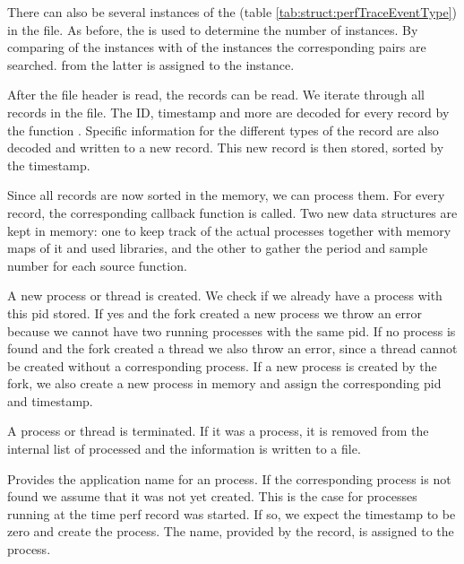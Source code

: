 There can also be several instances of the  (table \ref{tab:struct:perfTraceEventType}) in the file. As before, the  is used to determine the number of instances. By comparing  of the  instances with  of the  instances the corresponding pairs are search\-ed.  from the latter is assigned to the  instance.

After the file header is read, the records can be read. We iterate through all records in the file. The ID, timestamp and more are decoded for every record by the function . Specific information for the different types of the record are also decoded and written to a new record. This new record is then stored, sorted by the timestamp.

Since all records are now sorted in the memory, we can process them. For every record, the corresponding callback function is called. Two new data structures are kept in memory: one to keep track of the actual processes together with memory maps of it and used libraries, and the other to gather the period and sample number for each source function.

A new process or thread is created. We check if we already have a process with this pid stored. If yes and the fork created a new process we throw an error because we cannot have two running processes with the same pid. If no process is found and the fork created a thread we also throw an error, since a thread cannot be created without a corresponding process.
If a new process is created by the fork, we also create a new process in memory and assign the corresponding pid and timestamp.

A process or thread is terminated. If it was a process, it is removed from the internal list of processed and the information is written to a file.

Provides the application name for an process. If the corresponding process is not found we assume that it was not yet created. This is the case for processes running at the time perf record was started. If so, we expect the timestamp to be zero and create the process. The name, provided by the record, is assigned to the process.


